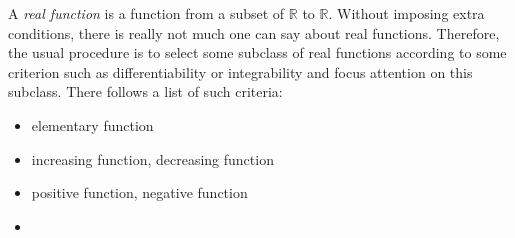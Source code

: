 \documentclass[12pt]{article}
\begin{document}
A {\em real function} is a function from a subset of $\mathbb{R}$ to $\mathbb{R}$.
Without imposing extra conditions, there is really not much one can say about real
functions.  Therefore, the usual procedure is to select some subclass of real 
functions according to some criterion such as differentiability or integrability
and focus attention on this subclass.  There follows a list of such criteria:

\begin{itemize}
\item elementary function
\item increasing function, decreasing function
\item positive function, negative function
\item
\end{itemize}
\end{document}
